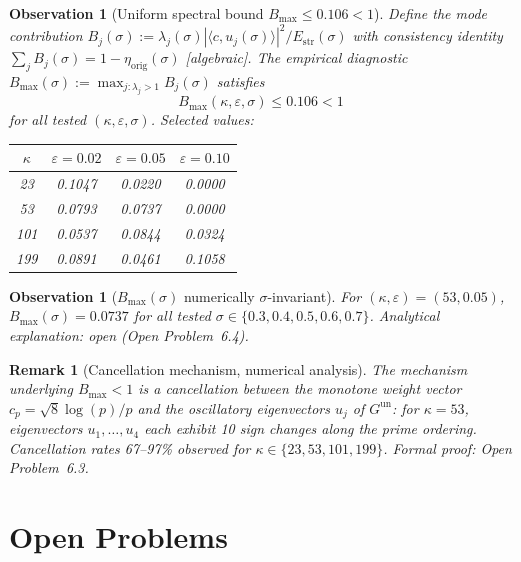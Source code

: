 \documentclass[11pt]{article}
\newtheorem{observation}[theorem]{Observation}
\newtheorem*{remark}{Remark}
\newcommand{\Estr}{E_{\mathrm{str}}}
\newcommand{\etaorig}{\eta_{\mathrm{orig}}}
\newcommand{\Gun}{G^{\mathrm{un}}}
\begin{document}
\begin{observation}[Uniform spectral bound $B_{\max}\leq 0.106<1$]
Define the mode contribution
$B_j(\sigma):=\lambda_j(\sigma)|\langle c,u_j(\sigma)\rangle|^2/\Estr(\sigma)$
with consistency identity $\sum_j B_j(\sigma)=1-\etaorig(\sigma)$ [algebraic].
The empirical diagnostic $B_{\max}(\sigma):=\max_{j:\lambda_j>1}B_j(\sigma)$
satisfies
\[
B_{\max}(\kappa,\varepsilon,\sigma)\leq 0.106<1
\]
for all tested $(\kappa,\varepsilon,\sigma)$. Selected values:

\begin{center}
\begin{tabular}{cccc}
\toprule
$\kappa$ & $\varepsilon=0.02$ & $\varepsilon=0.05$ & $\varepsilon=0.10$ \\
\midrule
23  & 0.1047 & 0.0220 & 0.0000 \\
53  & 0.0793 & 0.0737 & 0.0000 \\
101 & 0.0537 & 0.0844 & 0.0324 \\
199 & 0.0891 & 0.0461 & 0.1058 \\
\bottomrule
\end{tabular}
\end{center}
\end{observation}

\begin{observation}[$B_{\max}(\sigma)$ numerically $\sigma$-invariant]
For $(\kappa,\varepsilon)=(53,0.05)$, $B_{\max}(\sigma)=0.0737$ for all
tested $\sigma\in\{0.3,0.4,0.5,0.6,0.7\}$. Analytical explanation: open
(Open Problem~6.4).
\end{observation}

\begin{remark}[Cancellation mechanism, numerical analysis]
The mechanism underlying $B_{\max}<1$ is a cancellation between the monotone
weight vector $c_p=\sqrt{8}\log(p)/p$ and the oscillatory eigenvectors $u_j$
of $\Gun$: for $\kappa=53$, eigenvectors $u_1,\ldots,u_4$ each exhibit 10
sign changes along the prime ordering. Cancellation rates 67--97\% observed
for $\kappa\in\{23,53,101,199\}$. Formal proof: Open Problem~6.3.
\end{remark}

\section{Open Problems}
\end{document}
